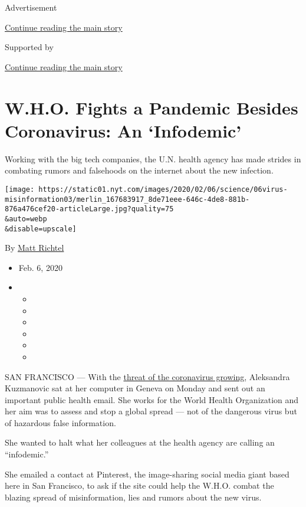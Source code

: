 Advertisement

\protect\hyperlink{after-top}{Continue reading the main story}

Supported by

\protect\hyperlink{after-sponsor}{Continue reading the main story}

\hypertarget{who-fights-a-pandemic-besides-coronavirus-an-infodemic}{%
\section{W.H.O. Fights a Pandemic Besides Coronavirus: An
`Infodemic'}\label{who-fights-a-pandemic-besides-coronavirus-an-infodemic}}

Working with the big tech companies, the U.N. health agency has made
strides in combating rumors and falsehoods on the internet about the new
infection.

\texttt{[image: https://static01.nyt.com/images/2020/02/06/science/06virus-misinformation03/merlin\_167683917\_8de71eee-646c-4de8-881b-876a476cef20-articleLarge.jpg?quality=75\\\&auto=webp\\\&disable=upscale]}

By \href{https://www.nytimes.com/by/matt-richtel}{Matt Richtel}

\begin{itemize}
\item
  Feb. 6, 2020
\item
  \begin{itemize}
  \item
  \item
  \item
  \item
  \item
  \item
  \end{itemize}
\end{itemize}

SAN FRANCISCO --- With the
\href{https://www.nytimes.com/2020/02/02/health/coronavirus-pandemic-china.html}{threat
of the coronavirus growing}, Aleksandra Kuzmanovic sat at her computer
in Geneva on Monday and sent out an important public health email. She
works for the World Health Organization and her aim was to assess and
stop a global spread --- not of the dangerous virus but of hazardous
false information.

She wanted to halt what her colleagues at the health agency are calling
an ``infodemic.''

She emailed a contact at Pinterest, the image-sharing social media giant
based here in San Francisco, to ask if the site could help the W.H.O.
combat the blazing spread of misinformation, lies and rumors about the
new virus.

